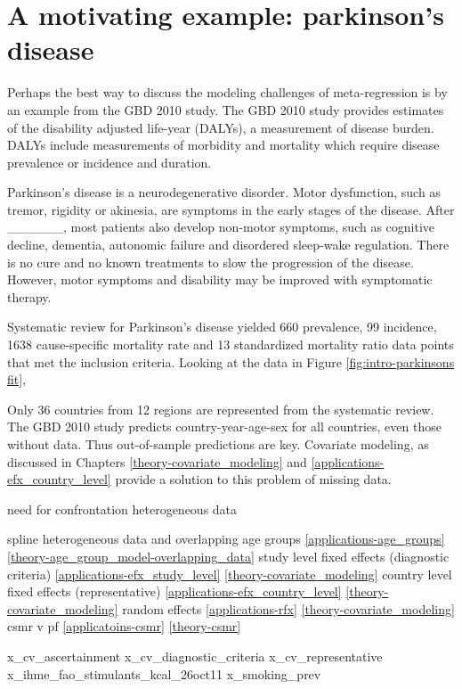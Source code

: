 \section{A motivating example: parkinson's disease}
\label{intro-complete_ex}

Perhaps the best way to discuss the modeling challenges of meta-regression is by an example from the GBD 2010 study.  The GBD 2010 study provides estimates of the disability adjusted life-year (DALYs), a measurement of disease burden.  DALYs include measurements of morbidity and mortality which require disease prevalence or incidence and duration.

Parkinson's disease is a neurodegenerative disorder.  Motor dysfunction, such as tremor, rigidity or akinesia, are symptoms in the early stages of the disease.  After ______, most patients also develop non-motor symptoms, such as cognitive decline, dementia, autonomic failure and disordered sleep-wake regulation.  There is no cure and no known treatments to slow the progression of the disease.  However, motor symptoms and disability may be improved with symptomatic therapy.

Systematic review for Parkinson's disease yielded 660 prevalence, 99 incidence, 1638 cause-specific mortality rate and 13 standardized mortality ratio data points that met the inclusion criteria.  Looking at the data in Figure \ref{fig:intro-parkinsons fit},


Only 36 countries from 12 regions are represented from the systematic review.  The GBD 2010 study predicts country-year-age-sex for all countries, even those without data.  Thus out-of-sample predictions are key.  Covariate modeling, as discussed in Chapters \ref{theory-covariate_modeling} and \ref{applications-efx_country_level} provide a solution to this problem of missing data.


need for confrontation
heterogeneous data

spline
heterogeneous data and overlapping age groups \ref{applications-age_groups} \ref{theory-age_group_model-overlapping_data}
study level fixed effects (diagnostic criteria) \ref{applications-efx_study_level} \ref{theory-covariate_modeling}
country level fixed effects (representative) \ref{applications-efx_country_level} \ref{theory-covariate_modeling}
random effects \ref{applications-rfx} \ref{theory-covariate_modeling}
csmr v pf \ref{applicatoins-csmr} \ref{theory-csmr}

x_cv_ascertainment
x_cv_diagnostic_criteria
x_cv_representative
x_ihme_fao_stimulants_kcal_26oct11
x_smoking_prev

